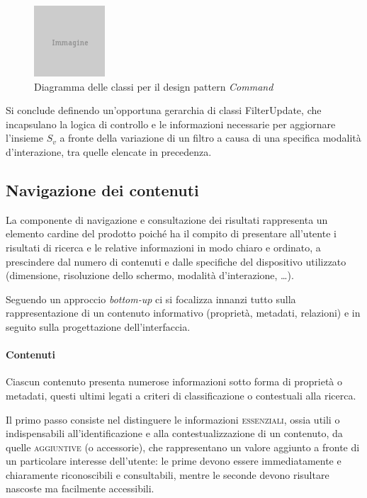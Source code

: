\begin{figure}[ht]
	\begin{center}
		\includegraphics{placeholder.png}
		\caption{Diagramma delle classi per il design pattern \textit{Command}}
		\label{fig:tesi:stage:design:design-pattern-command}
	\end{center}
\end{figure}

Si conclude definendo un'opportuna gerarchia di classi \textsf{FilterUpdate}, che incapsulano la logica di controllo e le informazioni necessarie per aggiornare l'insieme $S_v$ a fronte della variazione di un filtro a causa di una specifica modalità d'interazione, tra quelle elencate in precedenza.

\subsection{Navigazione dei contenuti}
La componente di navigazione e consultazione dei risultati rappresenta un elemento cardine del prodotto poiché ha il compito di presentare all'utente i risultati di ricerca e le relative informazioni in modo chiaro e ordinato, a prescindere dal numero di contenuti e dalle specifiche del dispositivo utilizzato (dimensione, risoluzione dello schermo, modalità d'interazione, \ldots).

Seguendo un approccio \textit{bottom-up} ci si focalizza innanzi tutto sulla rappresentazione di un contenuto informativo (proprietà, metadati, relazioni) e in seguito sulla progettazione dell'interfaccia.

\paragraph{Contenuti}
Ciascun contenuto presenta numerose informazioni sotto forma di proprietà o metadati, questi ultimi legati a criteri di classificazione o contestuali alla ricerca.

Il primo passo consiste nel distinguere le informazioni \textsc{essenziali}, ossia utili o indispensabili all'identificazione e alla contestualizzazione di un contenuto, da quelle \textsc{aggiuntive} (o accessorie), che rappresentano un valore aggiunto a fronte di un particolare interesse dell'utente: le prime devono essere immediatamente e chiaramente riconoscibili e consultabili, mentre le seconde devono risultare nascoste ma facilmente accessibili.


